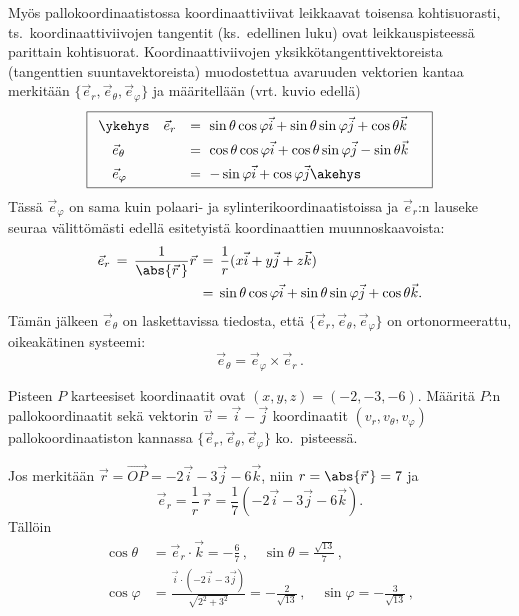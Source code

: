 Myös pallokoordinaatistossa koordinaattiviivat leikkaavat toisensa kohtisuorasti, ts.\
koordinaattiviivojen tangentit (ks.\ edellinen luku) ovat leikkauspisteessä parittain
kohtisuorat. Koordinaattiviivojen yksikkötangenttivektoreista (tangenttien suuntavektoreista)
muodostettua avaruuden vektorien kantaa merkitään $\{\vec e_r, \vec e_\theta, \vec e_\varphi\}$
ja määritellään (vrt. kuvio edellä)
\[
\boxed{
\begin{array}{ll}
\ykehys\quad \vec e_r &= \ \sin{\theta} \cos{\varphi} \vec i + \sin{\theta}\sin{\varphi} \vec j 
                                                             + \cos{\theta} \vec k \quad \\[4pt]
\quad   \vec e_\theta &= \ \cos{\theta} \cos{\varphi} \vec i + \cos{\theta}\sin{\varphi} \vec j 
                                                             - \sin{\theta} \vec k \\[4pt]
\quad  \vec e_\varphi &= \ -\sin{\varphi} \vec i + \cos{\varphi} \vec j \akehys
\end{array}
}
\]
Tässä $\vec e_\varphi$ on sama kuin polaari- ja sylinterikoordinaatistoissa ja $\vec e_r$:n 
lauseke seuraa välittömästi edellä esitetyistä koordinaattien muunnoskaavoista:
\begin{align*}
\vec e_r\,=\,\frac{1}{\abs{\vec r\,}}\vec r\,
               &=\,\frac{1}{r}(x\vec i+y\vec j+z\vec k) \\
               &=\,\sin{\theta} \cos{\varphi} \vec i + \sin{\theta}\sin{\varphi} \vec j 
                                                                  + \cos{\theta} \vec k.
\end{align*}
Tämän jälkeen $\vec e_\theta$ on laskettavissa tiedosta, että 
$\{\vec e_r,\vec e_\theta,\vec e_\varphi\}$ on ortonormeerattu, oikeakätinen systeemi: 
\[
\vec e_\theta=\vec e_\varphi\times\vec e_r\,.
\]
\begin{Exa} Pisteen $P$ karteesiset koordinaatit ovat $(x,y,z)=(-2,-3,-6)$. Määritä $P$:n
pallokoordinaatit sekä vektorin $\vec v=\vec i-\vec j$ koordinaatit $(v_r,v_\theta,v_\varphi)$
pallokoordinaatiston kannassa $\{\vec e_r,\vec e_\theta,\vec e_\varphi\}$ ko.\ pisteessä.
\end{Exa}
\ratk Jos merkitään $\vec r=\overrightarrow{OP}=-2\vec i-3\vec j-6\vec k$, niin
$r=\abs{\vec r\,}=7$ ja
\[
\vec e_r = \frac{1}{r}\,\vec r =\frac{1}{7}(-2\vec i-3 \vec j-6\vec k).
\]
Tällöin
\begin{align*}
\cos\theta\,&= \vec e_r\cdot\vec k = -\frac{6}{7}\,, \quad \sin\theta=\frac{\sqrt{13}}{7}\,, \\
\cos\varphi &= \frac{\vec i\cdot(-2\vec i-3\vec j)}{\sqrt{2^2+3^2}}=-\frac{2}{\sqrt{13}}\,,
                                                 \quad \sin\varphi =-\frac{3}{\sqrt{13}}\,,
\end{align*}
